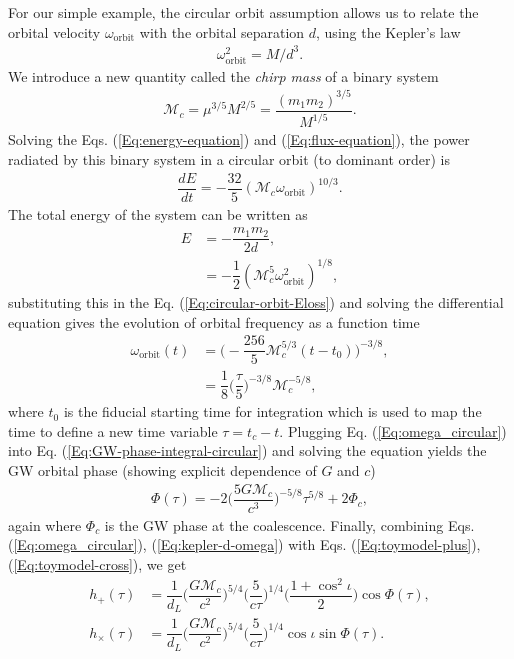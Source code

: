 For our simple example, the circular orbit assumption allows us to relate the orbital velocity $\omega_{\text{orbit}}$ with the orbital separation $d$, using the Kepler's law
\begin{align}
    \omega_{\text{orbit}}^2 = M/d^3. 
    \label{Eq:kepler-d-omega}
\end{align}
We introduce a new quantity called the \textit{chirp mass} of a binary system
\begin{align}
    \mathcal{M}_c = \mu^{3/5}M^{2/5} = \dfrac{(m_1m_2)^{3/5}}{M^{1/5}}.
\end{align}
Solving the Eqs. (\ref{Eq:energy-equation}) and (\ref{Eq:flux-equation}), the power radiated by this binary system in a circular orbit (to dominant order) is 
\begin{align}
    \dfrac{dE}{dt} = -\dfrac{32}{5}(\mathcal{M}_c\omega_{\text{orbit}})^{10/3}.
    \label{Eq:circular-orbit-Eloss}
\end{align}
The total energy of the system can be written as
\begin{align}
    E &= -\dfrac{m_1m_2}{2d},\\
    &= - \dfrac{1}{2}(\mathcal{M}_c^5\omega_{\text{orbit}}^2)^{1/8},
\end{align}
substituting this in the Eq. (\ref{Eq:circular-orbit-Eloss}) and solving the differential equation gives the evolution of orbital frequency as a function time 
\begin{align}
    \omega_{\text{orbit}}(t) &= \Big(-\dfrac{256}{5}\mathcal{M}_c^{5/3}(t-t_0) \Big)^{-3/8},\\
    &= \dfrac{1}{8}\Big(\dfrac{\tau}{5}\Big)^{-3/8}\mathcal{M}_c^{-5/8}, \label{Eq:omega_circular} %
\end{align}
where $t_0$ is the fiducial starting time for integration which is used to map the time to define a new time variable $\tau = t_c - t$. Plugging Eq. (\ref{Eq:omega_circular}) into Eq. (\ref{Eq:GW-phase-integral-circular}) and solving the equation yields the GW orbital phase (showing explicit dependence of $G$ and $c$)
\begin{align}
    \Phi(\tau) = -2\Big( \dfrac{5G\mathcal{M}_c}{c^3} \Big)^{-5/8} \tau^{5/8} + 2\Phi_{c},
    \label{Eq:gw-circular-newtonian-phase}
\end{align}
again where $\Phi_c$ is the GW phase at the coalescence. Finally, combining Eqs. (\ref{Eq:omega_circular}), (\ref{Eq:kepler-d-omega}) with Eqs. (\ref{Eq:toymodel-plus}), (\ref{Eq:toymodel-cross}), we get 
\begin{align}
    h_+(\tau) &= \dfrac{1}{d_L}\Big(\dfrac{G\mathcal{M}_c}{c^2}\Big)^{5/4}\Big(\dfrac{5}{c\tau}\Big)^{1/4}\Big(\dfrac{1+\cos^2\iota}{2}\Big)\cos\Phi(\tau),\\ 
    h_{\times}(\tau) &= \dfrac{1}{d_L}\Big(\dfrac{G\mathcal{M}_c}{c^2}\Big)^{5/4}\Big(\dfrac{5}{c\tau}\Big)^{1/4}\cos \iota\sin\Phi(\tau). 
\end{align}
